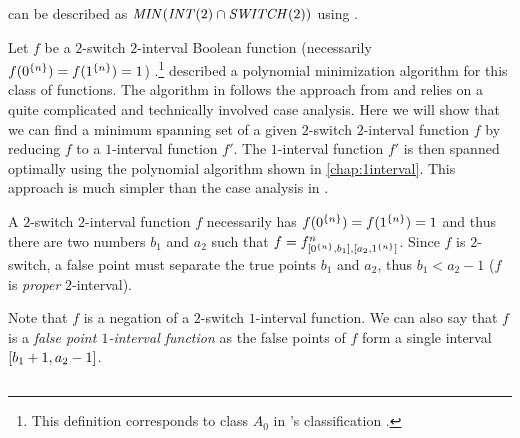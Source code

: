 can be described as
$\mathit{MIN} (\mathit{INT} (2) \cap \mathit{SWITCH} (2))$
using
.

Let $f$ be a $2$-switch $2$-interval Boolean function
(necessarily $f(0^{\{n\}}) = f(1^{\{n\}})
= 1$)
.\footnote{This definition corresponds to class $A_0$
in \citeauthor{Dubovsky2012}'s classification
\citep[p.~5]{Dubovsky2012}.}
\citeauthor{Dubovsky2012} described a polynomial minimization algorithm for this class of functions.
The algorithm in \citet[p.~17]{Dubovsky2012}
follows the approach from \citet{Schieber2005154}
and relies on a quite complicated and technically involved case analysis.
Here we will show that we can find a minimum spanning set of a given $2$-switch $2$-interval function $f$ by reducing $f$ to a $1$-interval function $f'$.
The $1$-interval function $f'$ is then spanned optimally
using the polynomial algorithm
shown in \cref{chap:1interval}.
This approach is much simpler
than the case analysis in \citet{Dubovsky2012}.

A $2$-switch $2$-interval function $f$ necessarily has $f(0^{\{n\}})=f(1^{\{n\}})=1$
and thus there are two numbers $b_1$ and $a_2$
such that $f = f^{n}_{[0^{\{n\}}, b_1], [a_2, 1^{\{n\}}]}$.
Since $f$ is $2$-switch,
a false point must separate the true points $b_1$ and $a_2$,
thus $b_1 < a_2-1$
($f$ is \emph{proper} $2$-interval).

Note that $f$ is a negation of a $2$-switch $1$-interval function.
We can also say that $f$ is a \emph{false point $1$-interval function}
as the false points of $f$ form a single interval
$[b_1+1, a_2-1]$.

\subsection{\algdesctitle}

